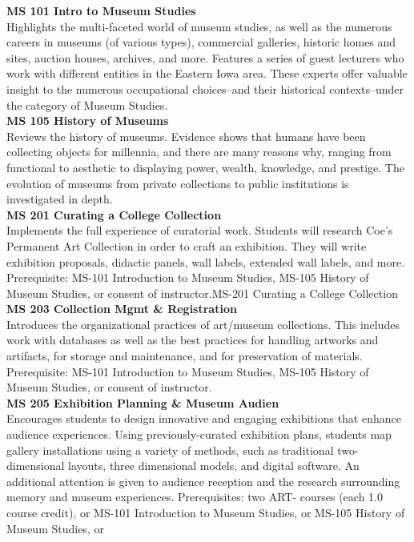 \documentclass[
  letterpaper,
]{scrbook}
\begin{document}
\textbf{MS 101 Intro to Museum Studies}\\
Highlights the multi-faceted world of museum studies, as well as the
numerous careers in museums (of various types), commercial galleries,
historic homes and sites, auction houses, archives, and more. Features a
series of guest lecturers who work with different entities in the
Eastern Iowa area. These experts offer valuable insight to the numerous
occupational choices--and their historical contexts--under the category
of Museum Studies.\\
\textbf{MS 105 History of Museums}\\
Reviews the history of museums. Evidence shows that humans have been
collecting objects for millennia, and there are many reasons why,
ranging from functional to aesthetic to displaying power, wealth,
knowledge, and prestige. The evolution of museums from private
collections to public institutions is investigated in depth.\\
\textbf{MS 201 Curating a College Collection}\\
Implements the full experience of curatorial work. Students will
research Coe's Permanent Art Collection in order to craft an exhibition.
They will write exhibition proposals, didactic panels, wall labels,
extended wall labels, and more. Prerequisite: MS-101 Introduction to
Museum Studies, MS-105 History of Museum Studies, or consent of
instructor.MS-201 Curating a College Collection\\
\textbf{MS 203 Collection Mgmt \& Registration}\\
Introduces the organizational practices of art/museum collections. This
includes work with databases as well as the best practices for handling
artworks and artifacts, for storage and maintenance, and for
preservation of materials. Prerequisite: MS-101 Introduction to Museum
Studies, MS-105 History of Museum Studies, or consent of instructor.\\
\textbf{MS 205 Exhibition Planning \& Museum Audien}\\
Encourages students to design innovative and engaging exhibitions that
enhance audience experiences. Using previously-curated exhibition plans,
students map gallery installations using a variety of methods, such as
traditional two-dimensional layouts, three dimensional models, and
digital software. An additional attention is given to audience reception
and the research surrounding memory and museum experiences.
Prerequisites: two ART- courses (each 1.0 course credit), or MS-101
Introduction to Museum Studies, or MS-105 History of Museum Studies, or
\end{document}

